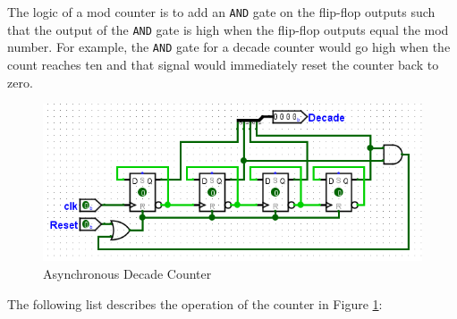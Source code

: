 The logic of a  mod counter is to add an \texttt{AND} gate on the flip-flop outputs such that the output of the \texttt{AND} gate is high when the flip-flop outputs equal the mod number. For example, the \texttt{AND} gate for a decade counter would go high when the count reaches ten and that signal would immediately reset the counter back to zero.

\begin{figure}[H]
	\centering
	\includegraphics[width=\maxwidth{.95\linewidth}]{gfx/count-03}
	\caption{Asynchronous Decade Counter}
	\label{fig:count-03}
\end{figure}

The following list describes the operation of the counter in Figure \ref{fig:count-03}:

